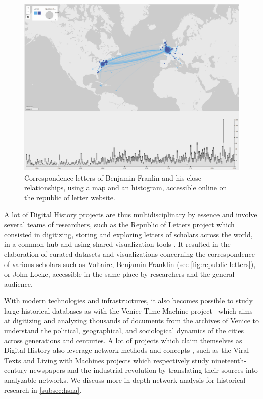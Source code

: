 \begin{figure}
    \centering %
    \includegraphics[width=1\textwidth]{static/figures/RelatedWork/RepublicOfLetter_BenjFranklin}
    \caption{Correspondence letters of Benjamin Franlin and his close relationships, using a map and an histogram, accessible online on the republic of letter website.}
    \label{fig:republic-letters}
\end{figure}

A lot of Digital History projects are thus multidisciplinary by essence and involve several teams of researchers, such as the Republic of Letters project which consisted in digitizing, storing and exploring letters of scholars across the world, in a common hub and using shared visualization tools \cite{edelsteinHistoricalResearchDigital2017}.
It resulted in the elaboration of curated datasets and visualizations concerning the correspondence of various scholars such as Voltaire, Benjamin Franklin (see \autoref{fig:republic-letters}), or John Locke, accessible in the same place by researchers and the general audience.

With modern technologies and infrastructures, it also becomes possible to study large historical databases as with the Venice Time Machine project~\cite{kaplanVeniceTimeMachine2015} which aims at digitizing and analyzing thousands of documents from the archives of Venice to understand the political, geographical, and sociological dynamics of the cities across generations and centuries.
A lot of projects which claim themselves as Digital History also leverage network methods and concepts \cite{ahnertNetworkTurnChanging2020}, such
as the Viral Texts \cite{cordell2017viral} and Living with Machines \cite{ardanuyLivingMachinesStudy2020} projects which respectively study nineteenth-century newspapers and the industrial revolution by translating their sources into analyzable networks.
We discuss more in depth network analysis for historical research in \autoref{subsec:hsna}.




